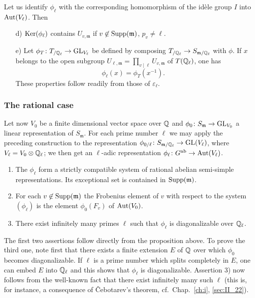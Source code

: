 \begin{obs}
Let us identify $\phi_\ell$ with the corresponding homomorphism of the idèle 
group $I$ into $\operatorname{Aut}(V_\ell)$. Then
\begin{enumerate}
	\item[d)] $\operatorname{Ker}(\phi_\ell)$ contains $U_{v , \mathfrak{m}}$ if $v \not\in 
	\operatorname{Supp}(\mathfrak{m})$, $p_v \neq \ell$.
	\item[e)]  Let $\phi_T \colon T_{/\mathbb{Q}_\ell} \to \operatorname{GL}_{V_\ell}$ be defined by 
	composing $T_{/\mathbb{Q}_\ell} \to S_{\mathfrak{m}/\mathbb{Q}_\ell}$ with $\phi$. If $x$ 
	belongs to the open subgroup $U_{\ell , \mathfrak{m}} = \prod_{v \mid \ell} 
	U_{v , \mathfrak{m}}$ of $T(\mathbb{Q}_\ell)$, one has
\[
	\phi_\ell (x) = \phi_T(x^{-1}).
\]
These properties follow readily from those of $\varepsilon_\ell$.
\end{enumerate}
\end{obs}

\subsubsection{The rational case}

Let now $V_0$ be a finite dimensional vector space over $\mathbb{Q}$ and 
$\phi_0 \colon S_\mathfrak{m} \to \operatorname{GL}_{V_0}$ a linear representation of 
$S_\mathfrak{m}$. For each prime number $\ell$ we may apply the preceding 
construction to the representation $\phi_{0/\ell} \colon S_{\mathfrak{m}/
\mathbb{Q}_{\ell}} \to \operatorname{GL}(V_\ell)$, where $V_\ell = V_0 \otimes \mathbb{Q}_\ell$; 
\dpage
we then get an $\ell$-adic representation $\phi_\ell \colon G^{\mathrm{ab}} \to \operatorname{Aut}
(V_\ell)$.

\begin{thm}
\begin{enumerate}[1)]
	\item The $\phi_\ell$ form a strictly compatible system of rational abelian 
	semi-simple representations. Its exceptional set is contained in $\operatorname{Supp}
	(\mathfrak{m})$.
	\item For each $v \not\in \operatorname{Supp}(\mathfrak{m})$ the Frobenius element of $v$ 
	with respect to the system $(\phi_\ell)$ is the element $\phi_0(F_v)$ 
	of $\operatorname{Aut}(V_0)$.
	\item There exist infinitely many primes $\ell$ such that $\phi_\ell$ is 
	diagonalizable over $\mathbb{Q}_\ell$.
\end{enumerate}
\end{thm}

The first two assertions follow directly from the proposition above. To prove 
the third one, note first that there exists a finite extension $E$ of $\mathbb{Q}$ over 
which $\phi_0$ becomes diagonalizable. If $\ell$ is a prime number which 
splits completely in $E$, one can embed $E$ into $\mathbb{Q}_\ell$ and this shows that 
$\phi_\ell$ is diagonalizable. Assertion 3) now follows from the well-known 
fact that there exist infinitely many such $\ell$ (this is, for instance, a 
consequence of \v Cebotarev's theorem, cf.\ Chap.~\ref{ch:i}, \ref{sec:II_22}).

